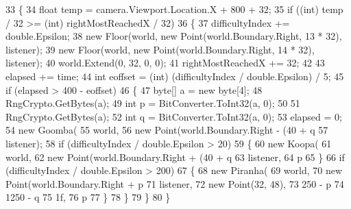 \begin{DoxyCode}
33         \{
34             \textcolor{keywordtype}{float} temp = camera.Viewport.Location.X + 800 + 32;
35             \textcolor{keywordflow}{if} ((\textcolor{keywordtype}{int}) temp / 32 >= (\textcolor{keywordtype}{int}) rightMostReachedX / 32)
36             \{
37                 difficultyIndex += \textcolor{keywordtype}{double}.Epsilon;
38                 \textcolor{keyword}{new} Floor(world, \textcolor{keyword}{new} Point(world.Boundary.Right, 13 * 32), 
      listener);
39                 \textcolor{keyword}{new} Floor(world, \textcolor{keyword}{new} Point(world.Boundary.Right, 14 * 32), 
      listener);
40                 world.Extend(0, 32, 0, 0);
41                 rightMostReachedX += 32;
42 
43                 elapsed += time;
44                 \textcolor{keywordtype}{int} eoffset = (int) (difficultyIndex / \textcolor{keywordtype}{double}.Epsilon) / 5;
45                 \textcolor{keywordflow}{if} (elapsed > 400 - eoffset)
46                 \{
47                     byte[] a = \textcolor{keyword}{new} byte[4];
48                     RngCrypto.GetBytes(a);
49                     \textcolor{keywordtype}{int} p = BitConverter.ToInt32(a, 0);
50 
51                     RngCrypto.GetBytes(a);
52                     \textcolor{keywordtype}{int} q = BitConverter.ToInt32(a, 0);
53                     elapsed = 0;
54                     \textcolor{keyword}{new} Goomba(
55                         world,
56                         \textcolor{keyword}{new} Point(world.Boundary.Right - (40 + q %
57                         listener);
58                     \textcolor{keywordflow}{if} (difficultyIndex / \textcolor{keywordtype}{double}.Epsilon > 20)
59                     \{
60                         \textcolor{keyword}{new} Koopa(
61                             world,
62                             \textcolor{keyword}{new} Point(world.Boundary.Right + (40 + q %
63                             listener,
64                             p %
65                     \}
66                     \textcolor{keywordflow}{if} (difficultyIndex / \textcolor{keywordtype}{double}.Epsilon > 200)
67                     \{
68                         \textcolor{keyword}{new} Piranha(
69                             world,
70                             \textcolor{keyword}{new} Point(world.Boundary.Right + p %
71                             listener,
72                             \textcolor{keyword}{new} Point(32, 48),
73                             250 - p %
74                             1250 - q %
75                             1f,
76                             p %
77                     \}
78                 \}
79             \}
80         \}
\end{DoxyCode}


